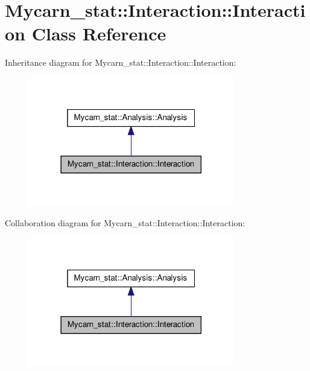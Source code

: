 \hypertarget{classMycarn__stat_1_1Interaction_1_1Interaction}{
\section{\-Mycarn\-\_\-stat\-:\-:\-Interaction\-:\-:\-Interaction \-Class \-Reference}
\label{classMycarn__stat_1_1Interaction_1_1Interaction}
}


\-Inheritance diagram for \-Mycarn\-\_\-stat\-:\-:\-Interaction\-:\-:\-Interaction\-:
\nopagebreak
\begin{figure}[H]
\begin{center}
\leavevmode
\includegraphics[width=254pt]{classMycarn__stat_1_1Interaction_1_1Interaction__inherit__graph}
\end{center}
\end{figure}


\-Collaboration diagram for \-Mycarn\-\_\-stat\-:\-:\-Interaction\-:\-:\-Interaction\-:
\nopagebreak
\begin{figure}[H]
\begin{center}
\leavevmode
\includegraphics[width=254pt]{classMycarn__stat_1_1Interaction_1_1Interaction__coll__graph}
\end{center}
\end{figure}
